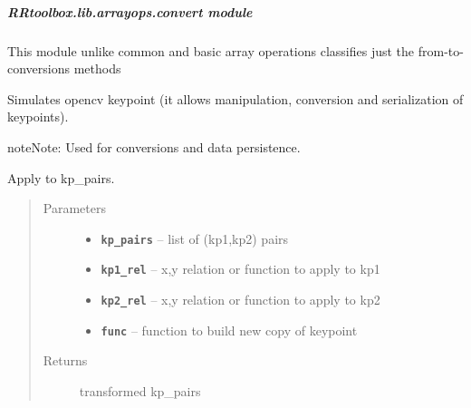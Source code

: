 \documentclass[letterpaper,10pt,english]{sphinxmanual}
\begin{document}
\subparagraph{RRtoolbox.lib.arrayops.convert module}
\label{RRtoolbox.lib.arrayops:module-RRtoolbox.lib.arrayops.convert}\label{RRtoolbox.lib.arrayops:rrtoolbox-lib-arrayops-convert-module}
This module unlike common and basic array operations classifies just the from-to-conversions methods

\begin{fulllineitems}
\label{RRtoolbox.lib.arrayops:RRtoolbox.lib.arrayops.convert.SimKeyPoint}
Simulates opencv keypoint (it allows manipulation, conversion and serialization of keypoints).

\begin{notice}{note}{Note:}
Used for conversions and data persistence.
\end{notice}

\end{fulllineitems}


\begin{fulllineitems}
\label{RRtoolbox.lib.arrayops:RRtoolbox.lib.arrayops.convert.apply2kp_pairs}
Apply to kp\_pairs.
\begin{quote}\begin{description}
\item[{Parameters}] \leavevmode\begin{itemize}
\item {} 
\textbf{\texttt{kp\_pairs}} -- list of (kp1,kp2) pairs

\item {} 
\textbf{\texttt{kp1\_rel}} -- x,y relation or function to apply to kp1

\item {} 
\textbf{\texttt{kp2\_rel}} -- x,y relation or function to apply to kp2

\item {} 
\textbf{\texttt{func}} -- function to build new copy of keypoint

\end{itemize}

\item[{Returns}] \leavevmode
transformed kp\_pairs

\end{description}\end{quote}

\end{fulllineitems}
\end{document}
